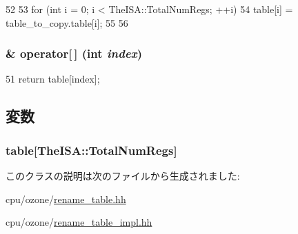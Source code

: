 \begin{DoxyCode}
52 {
53     for (int i = 0; i < TheISA::TotalNumRegs; ++i) {
54         table[i] = table_to_copy.table[i];
55     }
56 }
\end{DoxyCode}
\hypertarget{classRenameTable_aa4cb687631002d5fbca515c41b099588}{
\subsubsection[{operator[]}]{\& operator\mbox{[}$\,$\mbox{]} (int {\em index})}}
\label{classRenameTable_aa4cb687631002d5fbca515c41b099588}



\begin{DoxyCode}
51     { return table[index]; }
\end{DoxyCode}


\subsection{変数}
\hypertarget{classRenameTable_a35fd4e9d1b3d87751243fab1a88f8959}{
\subsubsection[{table}]{ {\bf table}\mbox{[}TheISA::TotalNumRegs\mbox{]}}}
\label{classRenameTable_a35fd4e9d1b3d87751243fab1a88f8959}


このクラスの説明は次のファイルから生成されました:\begin{DoxyCompactItemize}
\item 
cpu/ozone/\hyperlink{rename__table_8hh}{rename\_\-table.hh}\item 
cpu/ozone/\hyperlink{rename__table__impl_8hh}{rename\_\-table\_\-impl.hh}\end{DoxyCompactItemize}
